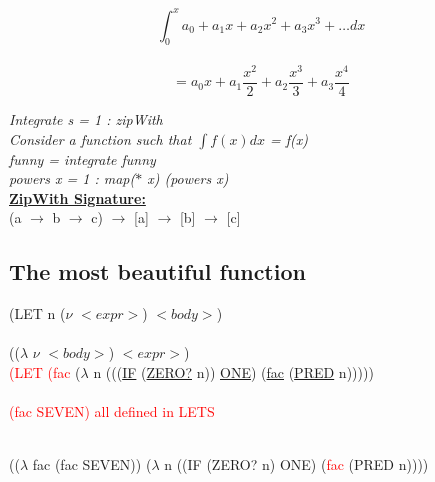 \documentclass{article}
\newcommand\tab[1][1cm]{\hspace*{#1}}
\begin{document}
\begin{flushleft}
\begin{flushleft}
\begin{large}
$$\int_{0}^{x} {a}_{0} + {a}_{1}x + {a}_{2}{x}^{2} + {a}_{3}{x}^{3} +\ldots dx $$ \\
$$= {a}_{0}x + {a}_{1}\dfrac{x^{2}}{2} + {a}_{2}\dfrac{x^{3}}{3} + {a}_{3}\dfrac{x^{4}}{4}$$
\end{large} 
\begin{flushleft}
\emph{Integrate s = 1 : zipWith\\
\bigskip
Consider a function such that $\int f(x)dx$ = f(x)\\
\tab funny = integrate funny\\
\bigskip
powers x = 1 : map($\ast$ x) (powers x)}\\
\vspace*{1cm}
\textbf{\underline{ZipWith Signature: }}\\
\bigskip
(a $\rightarrow$ b $\rightarrow$ c) $\rightarrow$ [a] $\rightarrow$ [b] $\rightarrow$ [c]
\end{flushleft}
\bigskip
\subsection*{The most beautiful function}
\begin{flushleft}
(LET n ($\nu$ $< expr >$) $< body >$)\\
\bigskip
{\LARGE \tab{$\downarrow$ desugar }}\\
\bigskip
(($\lambda$ $\nu$ $< body >$) $< expr >$)\\
\bigskip
\textcolor{red}{(LET (fac} ($\lambda$ n (((\underline{IF} (\underline{ZERO?} n)) \underline{ONE}) (\underline{fac} (\underline{PRED} n)))))\\
\bigskip
{\LARGE \tab{$\swarrow\downarrow\searrow$}}\\
\bigskip
\textcolor{red}{(fac SEVEN) all defined in LETS}\\
\bigskip

{\LARGE \tab{$\Downarrow$ desugar}}\\
\bigskip
(($\lambda$ fac (fac SEVEN)) ($\lambda$ n ((IF (ZERO? n) ONE) (\textcolor{red}{fac} (PRED  n))))\\


\end{flushleft}
\end{flushleft}
\end{flushleft}
\end{document}
